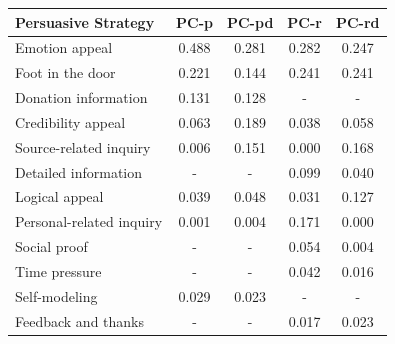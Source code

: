 \begin{table}[t]
    \centering
    \small
    \tabcolsep 3pt
    \begin{tabular}{lcccc}
        \toprule
        \bf{Persuasive Strategy} & \bf{PC-p} & \bf{PC-pd} & \bf{PC-r} & \bf{PC-rd} \\
        \midrule
        Emotion appeal & 0.488 & 0.281 & 0.282 & 0.247 \\ %
        Foot in the door & 0.221 & 0.144 & 0.241 & 0.241 \\ %
        Donation information & 0.131 & 0.128 & - & - \\ %
        Credibility appeal & 0.063 & 0.189 & 0.038 & 0.058 \\ %
        Source-related inquiry & 0.006 & 0.151 & 0.000 & 0.168 \\ %
        Detailed information & - & - & 0.099 & 0.040 \\ %
        Logical appeal & 0.039 & 0.048 & 0.031 & 0.127 \\ %
        Personal-related inquiry & 0.001 & 0.004 & 0.171 & 0.000 \\ %
        Social proof & - & - & 0.054 & 0.004 \\ %
        Time pressure & - & - & 0.042 & 0.016 \\ %
        Self-modeling & 0.029 & 0.023 & - & - \\ %
        Feedback and thanks & - & - & 0.017 & 0.023 \\ %

\end{tabular}
\end{table}
